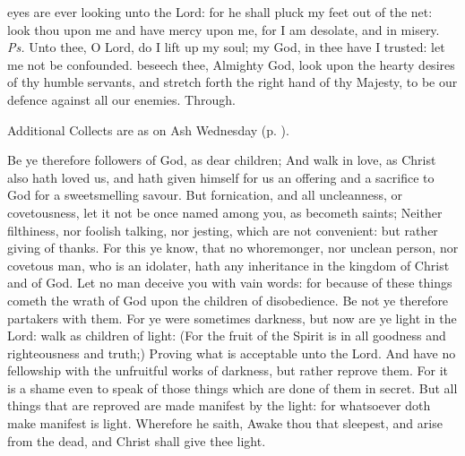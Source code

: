 \introit
{} eyes are ever looking unto the Lord: for he shall pluck my feet out of the net: look thou upon me and have mercy upon me, for I am desolate, and in misery. \textit{Ps.} Unto thee, O Lord, do I lift up my soul; my God, in thee have I trusted: let me not be confounded.
\collect
{} beseech thee, Almighty God, look upon the hearty desires of thy humble servants, and stretch forth the right hand of thy Majesty, to be our defence against all our enemies. Through.
\begin{rubric}
    Additional Collects are as on Ash Wednesday (p. \pageref{AshWednesdayMass}).
\end{rubric}
 Be ye therefore followers of God, as dear children; And walk in love, as Christ also hath loved us, and hath given himself for us an offering and a sacrifice to God for a sweetsmelling savour. But fornication, and all uncleanness, or covetousness, let it not be once named among you, as becometh saints; Neither filthiness, nor foolish talking, nor jesting, which are not convenient: but rather giving of thanks. For this ye know, that no whoremonger, nor unclean person, nor covetous man, who is an idolater, hath any inheritance in the kingdom of Christ and of God. Let no man deceive you with vain words: for because of these things cometh the wrath of God upon the children of disobedience. Be not ye therefore partakers with them. For ye were sometimes darkness, but now are ye light in the Lord: walk as children of light: (For the fruit of the Spirit is in all goodness and righteousness and truth;) Proving what is acceptable unto the Lord. And have no fellowship with the unfruitful works of darkness, but rather reprove them. For it is a shame even to speak of those things which are done of them in secret. But all things that are reproved are made manifest by the light: for whatsoever doth make manifest is light. Wherefore he saith, Awake thou that sleepest, and arise from the dead, and Christ shall give thee light.


